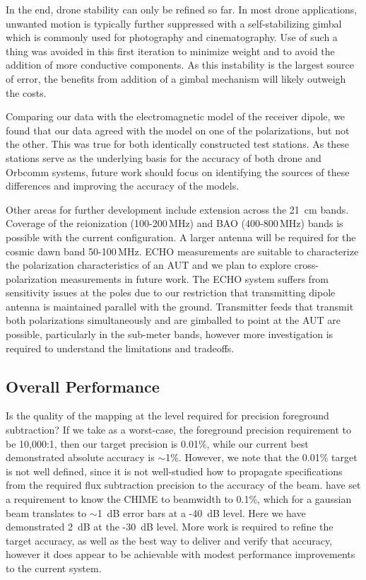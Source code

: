 \documentclass[preprint2,numberedappendix,tighten,twocolappendix]{aastex6}
\begin{document}
In the end, drone stability can only be refined so far. In most drone applications, unwanted motion is typically further suppressed with a self-stabilizing gimbal which is commonly used for photography and cinematography. Use of such a thing was avoided in this first iteration to minimize weight and to avoid the addition of more conductive components. As this instability is the largest source of error, the benefits from addition of a gimbal mechanism will likely outweigh the costs. 

Comparing our data with the electromagnetic model of the receiver dipole, we found that our data agreed with the model on one of the polarizations, but not the other.  This was true for both identically constructed test stations. As these stations serve as the underlying basis for the accuracy of both drone and Orbcomm systems, future work should focus on identifying the sources of these differences and improving the accuracy of the models.

Other areas for further development include extension across the 21~cm bands. Coverage of the reionization (100-200\,MHz) and BAO (400-800\,MHz) bands is possible with the current configuration. A larger antenna will be required for the cosmic dawn band 50-100\,MHz.  ECHO measurements are suitable to characterize the polarization characteristics of an AUT and we plan to explore cross-polarization measurements in future work.   The ECHO system  suffers from sensitivity issues at the poles due to our restriction that transmitting dipole antenna is maintained parallel with the ground. Transmitter feeds that transmit both polarizations simultaneously and are gimballed to point at the AUT are possible, particularly in the sub-meter bands, however more investigation is required to understand the limitations and tradeoffs.

\subsection{Overall Performance}

Is the quality of the mapping at the level required for precision foreground subtraction?   If we take as a worst-case, the foreground precision requirement to be 10,000:1, then our target precision is 0.01\%, while our current best demonstrated absolute accuracy is $\sim$1\%.  However, we note that the 0.01\% target is not well defined, since it is not well-studied how to propagate specifications from the required flux subtraction precision to the accuracy of the beam. \citet{Shaw2015_chimemmodes} have set a requirement to know the CHIME to beamwidth to 0.1\%, which for a gaussian beam translates to $\sim$1~dB error bars at a -40~dB level. Here we have demonstrated 2~dB at the -30~dB level.  More work is required to refine the target accuracy, as well as the best way to deliver and verify that accuracy, however it does appear to be achievable with modest performance improvements to the current system.
\end{document}
